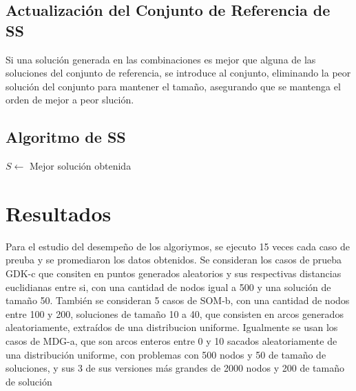 \documentclass{ci5652}
\begin{document}
\subsection{Actualización del Conjunto de Referencia de SS}
Si una solución generada en las combinaciones es mejor que alguna de las soluciones del conjunto de referencia, se introduce al conjunto, eliminando la peor solución del conjunto para mantener el tamaño, asegurando que se mantenga el orden de mejor a peor slución.

\subsection{Algoritmo de SS}

\begin{algorithm}
\DontPrintSemicolon
$S \leftarrow$ Mejor solución obtenida\;
\end{algorithm}

\section{Resultados}
Para el estudio del desempeño de los algoriymos, se ejecuto 15 veces cada caso de preuba y se promediaron
los datos obtenidos. Se consideran los casos de prueba GDK-c que consiten en puntos generados aleatorios y
sus respectivas distancias euclidianas entre si, con una cantidad de nodos igual a 500 y una solución de tamaño 50.
También se consideran 5 casos de SOM-b, con una cantidad de nodos entre 100 y 200, soluciones de tamaño 10 a 40, que consisten
en arcos generados aleatoriamente, extraídos de una distribucion uniforme. Igualmente se usan los casos de MDG-a, que
son arcos enteros entre 0 y 10 sacados aleatoriamente de una distribución uniforme, con problemas con 500 nodos y 50 de tamaño de soluciones, y sus 3 de sus versiones más grandes de 2000 nodos y 200 de tamaño de solución
\end{document}

